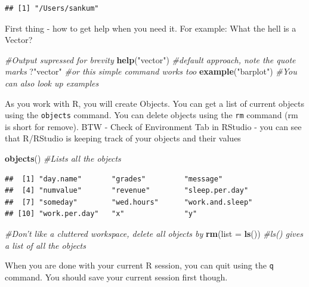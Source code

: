 \documentclass[]{krantz}
\makeatletter
\newenvironment{Shaded}{\begin{snugshade}}{\end{snugshade}}
\newcommand{\KeywordTok}[1]{\textcolor[rgb]{0.27,0.27,0.27}{\textbf{#1}}}
\newcommand{\DataTypeTok}[1]{\textcolor[rgb]{0.27,0.27,0.27}{#1}}
\newcommand{\StringTok}[1]{\textcolor[rgb]{0.5,0.5,0.5}{#1}}
\newcommand{\CommentTok}[1]{\textcolor[rgb]{0.56,0.35,0.01}{\textit{#1}}}
\newcommand{\NormalTok}[1]{#1}
\newenvironment{kframe}{%
\medskip{}
\setlength{\fboxsep}{.8em}
 \def\at@end@of@kframe{}%
 \ifinner\ifhmode%
  \def\at@end@of@kframe{\end{minipage}}%
  \begin{minipage}{\columnwidth}%
 \fi\fi%
 \def\FrameCommand##1{\hskip\@totalleftmargin \hskip-\fboxsep
 \colorbox{shadecolor}{##1}\hskip-\fboxsep
     \hskip-\linewidth \hskip-\@totalleftmargin \hskip\columnwidth}%
 \MakeFramed {\advance\hsize-\width
   \@totalleftmargin\z@ \linewidth\hsize
   \@setminipage}}%
 {\par\unskip\endMakeFramed%
 \at@end@of@kframe}
\renewenvironment{Shaded}{\begin{kframe}}{\end{kframe}}
\theoremstyle{definition}
\theoremstyle{definition}
\theoremstyle{definition}
\theoremstyle{remark}
\makeatother
\begin{document}
\begin{verbatim}
## [1] "/Users/sankum"
\end{verbatim}

First thing - how to get help when you need it. For example: What the
hell is a Vector?

\begin{Shaded}
\begin{Highlighting}[]
\CommentTok{#Output supressed for brevity}
\KeywordTok{help}\NormalTok{(}\StringTok{"vector"}\NormalTok{) }\CommentTok{#default approach, note the quote marks}
\NormalTok{?}\StringTok{"vector"} \CommentTok{#or this simple command works too}
\KeywordTok{example}\NormalTok{(}\StringTok{"barplot"}\NormalTok{) }\CommentTok{#You can also look up examples}
\end{Highlighting}
\end{Shaded}

As you work with R, you will create Objects. You can get a list of
current objects using the \texttt{objects} command. You can delete
objects using the \texttt{rm} command (rm is short for remove). BTW -
Check of Environment Tab in RStudio - you can see that R/RStudio is
keeping track of your objects and their values

\begin{Shaded}
\begin{Highlighting}[]
\KeywordTok{objects}\NormalTok{() }\CommentTok{#Lists all the objects}
\end{Highlighting}
\end{Shaded}

\begin{verbatim}
##  [1] "day.name"       "grades"         "message"       
##  [4] "numvalue"       "revenue"        "sleep.per.day" 
##  [7] "someday"        "wed.hours"      "work.and.sleep"
## [10] "work.per.day"   "x"              "y"
\end{verbatim}

\begin{Shaded}
\begin{Highlighting}[]
\CommentTok{#Don't like a cluttered workspace, delete all objects by}
\KeywordTok{rm}\NormalTok{(}\DataTypeTok{list =} \KeywordTok{ls}\NormalTok{())  }\CommentTok{#ls() gives a list of all the objects}
\end{Highlighting}
\end{Shaded}

When you are done with your current R session, you can quit using the
\texttt{q} command. You should save your current session first though.
\end{document}
